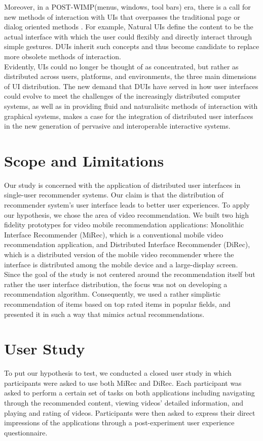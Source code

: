 Moreover, in a POST-WIMP(menus, windows, tool bars) era, there is a call for new
methods of interaction with UIs that overpasses the traditional page or dialog
oriented methods \cite{seifried2011lessons}. For example, Natural UIs
define the content to be the actual interface with which the user could flexibly and directly interact through simple gestures. DUIs inherit such
concepts and thus become candidate to replace more obsolete methods of
interaction.\\
Evidently, UIs could no longer be thought of as concentrated, but rather as
distributed across users, platforms, and environments, the three main dimensions
of UI distribution. The new demand that DUIs have served in how user interfaces
could evolve to meet the challenges of the increasingly distributed computer
systems, as well as in providing fluid and naturalisitc methods of interaction
with graphical systems, makes a case for the integration of distributed user
interfaces in the new generation of pervasive and interoperable interactive
systems.
\section{Scope and Limitations}
Our study is concerned with the application of distributed user interfaces in
single-user recommender systems. Our claim is that the distribution of
recommender system's user interface leads to better user experiences. To apply
our hypothesis, we chose the area of video recommendation. We built two high
fidelity prototypes for video mobile recommendation applications: Monolithic
Interface Recommender (MiRec), which is a conventional mobile video
recommendation application, and Distributed Interface Recommender (DiRec), which is a distributed version of the mobile video recommender where the interface is distributed among
the mobile device and a large-display screen.\\
Since the goal of the study is not centered around the recommendation itself but
rather the user interface distribution, the focus was not on developing a
recommendation algorithm. Consequently, we used a rather simplistic
recommendation of items based on top rated items in popular fields, and
presented it in such a way that mimics actual recommendations.

\section{User Study}
To put our hypothesis to test, we conducted a closed user study in which
participants were asked to use both MiRec and DiRec. Each
participant was asked to perform a certain set of tasks on both applications
including navigating through the recommended content, viewing videos' detailed
information, and playing and rating of videos. Participants were then asked to
express their direct impressions of the applications through a post-experiment
user experience questionnaire.

